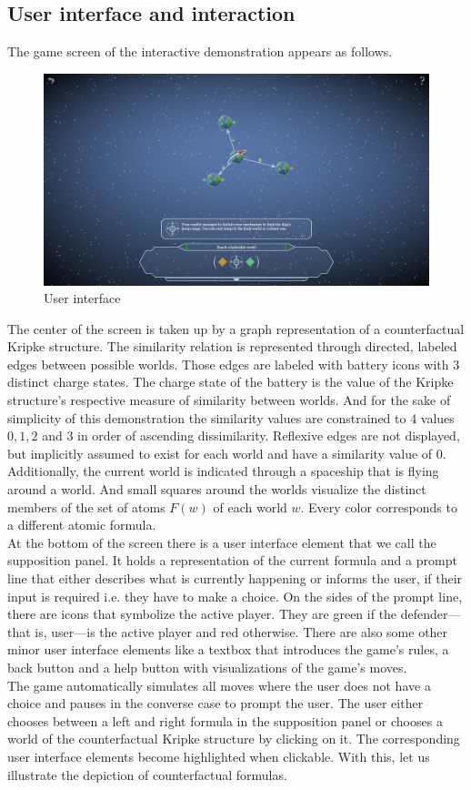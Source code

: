 \documentclass[a4paper,american,10pt]{paper}
\theoremstyle{definition}\newtheorem{definition}{Definition}
\begin{document}
\subsection{User interface and interaction}\label{sec:interface}
The game screen of the interactive demonstration appears as follows.
\begin{figure}[H]
\centering
\includegraphics[width=\textwidth]{UI_Layout}
\caption{User interface}
\end{figure}
The center of the screen is taken up by a graph representation of a counterfactual Kripke structure. The similarity relation is represented through directed, labeled edges between possible worlds. Those edges are labeled with battery icons with 3 distinct charge states. The charge state of the battery is the value of the Kripke structure's respective measure of similarity between worlds. And for the sake of simplicity of this demonstration the similarity values are constrained to 4 values $0,1,2$ and $3$ in order of ascending dissimilarity. Reflexive edges are not displayed, but implicitly assumed to exist for each world and have a similarity value of 0. Additionally, the current world is indicated through a spaceship that is flying around a world. And small squares around the worlds visualize the distinct members of the set of atoms $F(w)$ of each world $w$. Every color corresponds to a different atomic formula.\\
\indent At the bottom of the screen there is a user interface element that we call the supposition panel. It holds a representation of the current formula and a prompt line that either describes what is currently happening or informs the user, if their input is required i.e. they have to make a choice. On the sides of the prompt line, there are icons that symbolize the active player. They are green if the defender---that is, user---is the active player and red otherwise.
There are also some other minor user interface elements like a textbox that introduces the game's rules, a back button and a help button with visualizations of the game's moves.\\
\indent The game automatically simulates all moves where the user does not have a choice and pauses in the converse case to prompt the user. The user either chooses between a left and right formula in the supposition panel or chooses a world of the counterfactual Kripke structure by clicking on it. The corresponding user interface elements become highlighted when clickable. With this, let us illustrate the depiction of counterfactual formulas.
\end{document}
